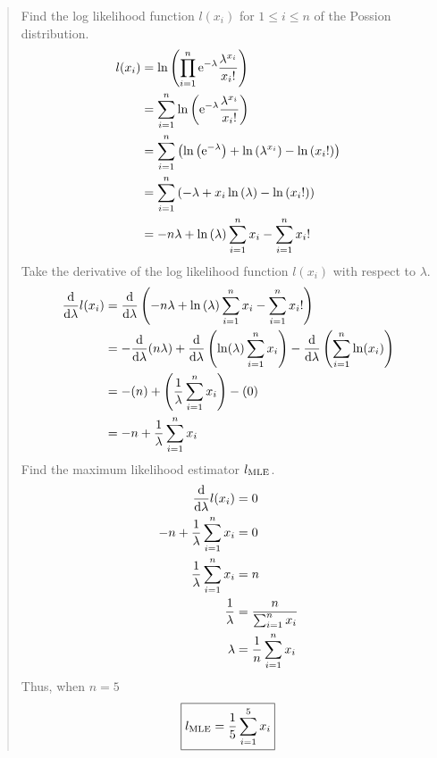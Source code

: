 \begin{quote}
	Find the log likelihood function $l(x_i)$ for $1 \leq i \leq n$ of the Possion distribution.
	\begin{align*}
	    l(x_i) &= \ln \left( \prod_{i=1}^n {\rm e}^{-\lambda} \frac{\lambda^{x_i}}{x_i!} \right) \\
		&= \sum_{i=1}^n \ln \left( {\rm e}^{-\lambda} \frac{\lambda^{x_i}}{x_i!} \right) \\
		&= \sum_{i=1}^n \left( \ln\left( {\rm e}^{-\lambda} \right) + \ln\left( \lambda^{x_i} \right) - \ln\left( x_i! \right) \right) \\
		&= \sum_{i=1}^n \left( -\lambda + x_i \ln\left(\lambda \right) - \ln\left( x_i! \right) \right) \\
		&= -n \lambda + \ln\left(\lambda \right) \sum_{i=1}^n x_i - \sum_{i=1}^n x_i ! 
	\end{align*}
	Take the derivative of the log likelihood function $l(x_i)$ with respect to $\lambda$.
	\begin{align*}
	    \frac{{\rm d}}{{\rm d}\lambda} l(x_i) &= \frac{{\rm d}}{{\rm d}\lambda} \left( -n \lambda + \ln\left(\lambda \right) \sum_{i=1}^n x_i - \sum_{i=1}^n x_i ! \right) \\
		&= - \frac{{\rm d}}{{\rm d}\lambda} (n \lambda) + \frac{{\rm d}}{{\rm d}\lambda} \left( \ln(\lambda) \sum_{i=1}^n x_i \right) - \frac{{\rm d}}{{\rm d}\lambda} \left( \sum_{i=1}^n \ln(x_i) \right) \\
		&= - (n) + \left( \frac{1}{\lambda} \sum_{i=1}^n x_i \right) - (0) \\
		&= - n + \frac{1}{\lambda} \sum_{i=1}^n x_i
	\end{align*}
	Find the maximum likelihood estimator $l_{{\rm MLE}}$.
	\begin{align*}
	    \frac{{\rm d}}{{\rm d}\lambda} l(x_i) &= 0 \\
	    - n + \frac{1}{\lambda} \sum_{i=1}^n x_i &= 0 \\
	    \frac{1}{\lambda} \sum_{i=1}^n x_i &= n \\
	    \frac{1}{\lambda} &= \frac{n}{\sum_{i=1}^n x_i} \\
	    \lambda &= \frac{1}{n} \sum_{i=1}^n x_i
	\end{align*}
	Thus, when $n=5$ $$\boxed{ l_{{\rm MLE}} = \frac{1}{5} \sum_{i=1}^5 x_i }$$
\end{quote}
